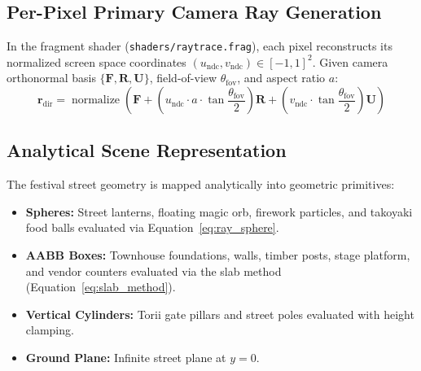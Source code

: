\subsection{Per-Pixel Primary Camera Ray Generation}
In the fragment shader (\texttt{shaders/raytrace.frag}), each pixel reconstructs its normalized screen space coordinates $(u_{\text{ndc}}, v_{\text{ndc}}) \in [-1, 1]^2$. Given camera orthonormal basis $\{\mathbf{F}, \mathbf{R}, \mathbf{U}\}$, field-of-view $\theta_{\text{fov}}$, and aspect ratio $a$:
\begin{equation}
\mathbf{r}_{\text{dir}} = \operatorname{normalize}\left( \mathbf{F} + \left(u_{\text{ndc}} \cdot a \cdot \tan\frac{\theta_{\text{fov}}}{2}\right) \mathbf{R} + \left(v_{\text{ndc}} \cdot \tan\frac{\theta_{\text{fov}}}{2}\right) \mathbf{U} \right)
\label{eq:camera_ray_gen}
\end{equation}

\subsection{Analytical Scene Representation}
The festival street geometry is mapped analytically into geometric primitives:
\begin{itemize}
    \item \textbf{Spheres:} Street lanterns, floating magic orb, firework particles, and takoyaki food balls evaluated via Equation~\ref{eq:ray_sphere}.
    \item \textbf{AABB Boxes:} Townhouse foundations, walls, timber posts, stage platform, and vendor counters evaluated via the slab method (Equation~\ref{eq:slab_method}).
    \item \textbf{Vertical Cylinders:} Torii gate pillars and street poles evaluated with height clamping.
    \item \textbf{Ground Plane:} Infinite street plane at $y = 0$.
\end{itemize}


